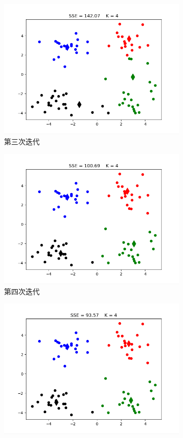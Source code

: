 \documentclass[bachelor,adobefonts]{jnuthesis}
\begin{document}
\begin{figure}[h!]
\begin{subfigure}[b]{0.4\linewidth}
    \includegraphics[width=\linewidth]{W4-3.png}
    \caption{第三次迭代}
  \end{subfigure}
  \begin{subfigure}[b]{0.4\linewidth}
    \includegraphics[width=\linewidth]{W4-4.png}
    \caption{第四次迭代}
  \end{subfigure}
  \begin{subfigure}[b]{0.4\linewidth}
    \includegraphics[width=\linewidth]{W4-5.png}

\end{subfigure}
\end{figure}
\end{document}
